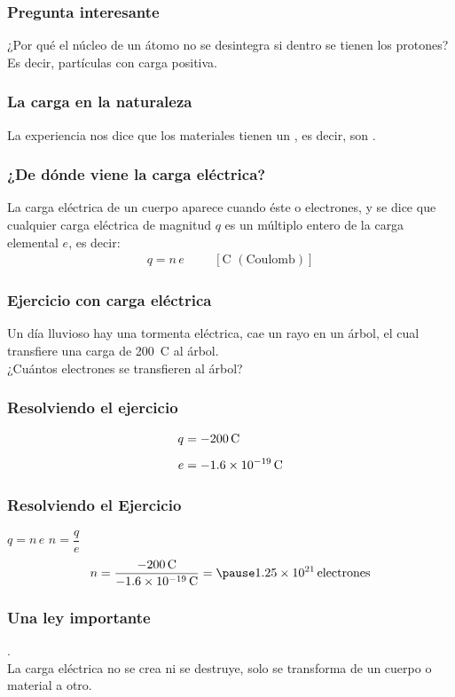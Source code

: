 \documentclass[14pt]{beamer}
\begin{document}
\begin{frame}
\frametitle{Pregunta interesante}
¿Por qué el núcleo de un átomo no se desintegra si dentro se tienen los protones? Es decir, partículas con carga positiva. 
\end{frame}
\begin{frame}
\frametitle{La carga en la naturaleza}
La experiencia nos dice que los materiales tienen un , \pause es decir, son .
\end{frame}
\begin{frame}
\frametitle{¿De dónde viene la carga eléctrica?}
La carga eléctrica de un cuerpo aparece cuando éste  o  electrones, \pause y se dice que cualquier carga eléctrica de magnitud $q$ es un múltiplo entero de la carga elemental $e$, es decir:
\pause
\begin{align*}
q = n \, e \hspace{1cm} \left[ \unit{\coulomb} \,\, (\text{Coulomb}) \right]
\end{align*}
\end{frame}
\begin{frame}
\frametitle{Ejercicio con carga eléctrica}
Un día lluvioso hay una tormenta eléctrica, cae un rayo en un árbol, el cual transfiere una carga de \SI{200}{\coulomb} al árbol.
\\
\bigskip
\pause
¿Cuántos electrones se transfieren al árbol?
\end{frame}
\begin{frame}
\frametitle{Resolviendo el ejercicio}
\begin{align*}
q &= - \SI{200}{\coulomb} \\[0.5em]
e &= - \SI{1.6d-19}{\coulomb}
\end{align*}
\end{frame}
\begin{frame}
\frametitle{Resolviendo el Ejercicio}
 \pause \quad $q = n \, e$ \pause \quad $n =\dfrac{q}{e}$
\pause
\\
\begin{eqnarray*}
\begin{aligned}
n = \dfrac{- \SI{200}{\coulomb}}{- \SI{1.6d-19}{\coulomb}} = \pause \num{1.25d21} \, \text{electrones}
\end{aligned}
\end{eqnarray*}
\end{frame}
\begin{frame}
\frametitle{Una ley importante}
.
\\
\bigskip
La carga eléctrica no se crea ni se destruye, solo se transforma de un cuerpo o material a otro.
\end{frame}
\end{document}
